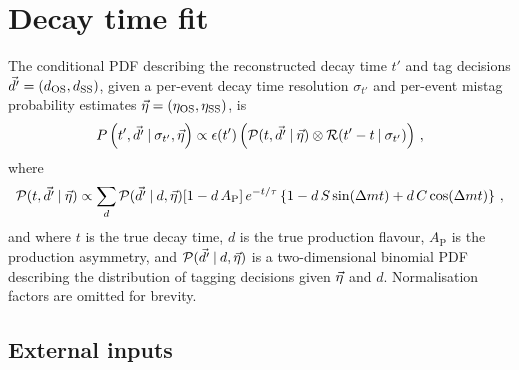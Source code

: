 
\section{Decay time fit}
\label{sec:b02dd:decaytimefit}

The conditional PDF describing the reconstructed decay time $t'$ and tag
decisions $\vec{d'} = (d_{\text{OS}}, d_{\text{SS}})$, given a per-event decay time resolution
$\sigma_{t'}$ and per-event mistag probability estimates $\vec{\eta} = (\eta_{\text{OS}},
\eta_{\text{SS}})$, is
%
\begin{equation}\label{eq:fullpdf}
  P\left(t',\vec{d'}\:\vert\: \sigma_{t'},\vec{\eta}\right)
  \propto \epsilon(t') \left(\mathcal{P}(t,\vec{d'}\:\vert\: \vec{\eta})
    \otimes \mathcal{R}(t'-t\:\vert\: \sigma_{t'})\right)\,,
\end{equation}
%
where
\begin{equation}
  \mathcal{P}(t,\vec{d'}\:\vert\: \vec{\eta}) \\
  \propto \sum_{d} \mathcal{P}(\vec{d'} \:\vert\: d,\vec{\eta})
      [1 - d\, A_\text{P}] \,
      e^{-t/\tau}\left\{1 - d\, S \sin({\Delta m} t) + d\, C \cos({\Delta m} t)\right\}\,,
\end{equation}
and where $t$ is the true decay time, $d$ is the true production flavour,
$A_\text{P}$ is the production asymmetry, and $\mathcal{P}(\vec{d'} \:\vert\:
d,\vec{\eta})$ is a two-dimensional binomial PDF describing the distribution
of tagging decisions given $\vec{\eta}$ and $d$. Normalisation factors are omitted for brevity.



\FloatBarrier


\FloatBarrier
\subsection{External inputs}
\label{sec:b02dd:decaytimefit:constraints}

